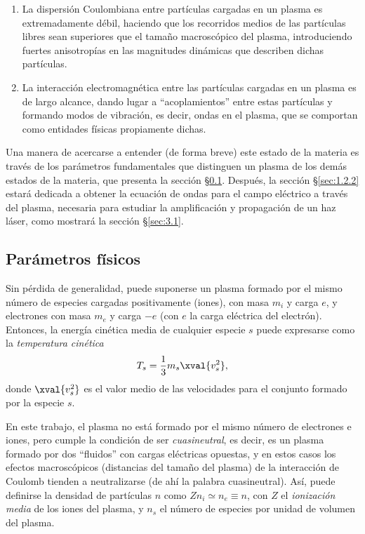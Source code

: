 \begin{enumerate}[label=(\roman*)]

    \item La dispersión Coulombiana entre partículas cargadas en un plasma es extremadamente débil, haciendo que los recorridos medios de las partículas libres sean superiores que el tamaño macroscópico del plasma, introduciendo fuertes anisotropías en las magnitudes dinámicas que describen dichas partículas.

    \item La interacción electromagnética entre las partículas cargadas en un plasma es de largo alcance, dando lugar a \enquote{acoplamientos} entre estas partículas y formando modos de vibración, es decir, ondas en el plasma, que se comportan como entidades físicas propiamente dichas.

\end{enumerate}

Una manera de acercarse a entender (de forma breve) este estado de la materia es través de los parámetros fundamentales que distinguen un plasma de los demás estados de la materia, que presenta la sección \S\ref{sec:1.2.1}. Después, la sección \S\ref{sec:1.2.2} estará dedicada a obtener la ecuación de ondas para el campo eléctrico a través del plasma, necesaria para estudiar la amplificación y propagación de un haz láser, como mostrará la sección \S\ref{sec:3.1}.

\subsection{Parámetros físicos}\label{sec:1.2.1}
Sin pérdida de generalidad, puede suponerse un plasma formado por el mismo número de especies cargadas positivamente (iones), con masa $m_{i}$ y carga $e$, y electrones con masa $m_{e}$ y carga $-e$ (con $e$ la carga eléctrica del electrón). Entonces, la energía cinética media de cualquier especie $s$ puede expresarse como la \emph{temperatura cinética} \autocite{Fitzpatrick2022}
\begin{equation}\label{eq:1.46}
  T_{s} = \frac{1}{3}m_{s}\xval{v_{s}^{2}},
\end{equation}
donde $\xval{v_{s}^{2}}$ es el valor medio de las velocidades para el conjunto formado por la especie $s$.

En este trabajo, el plasma no está formado por el mismo número de electrones e iones, pero cumple la condición de ser \emph{cuasineutral}, es decir, es un plasma formado por dos \enquote{fluidos} con cargas eléctricas opuestas, y en estos casos los efectos macroscópicos (distancias del tamaño del plasma) de la interacción de Coulomb tienden a neutralizarse (de ahí la palabra cuasineutral). Así, puede definirse la densidad de partículas $n$ como $Zn_{i} \simeq n_{e} \equiv n$, con $Z$ el \emph{ionización media} de los iones del plasma, y $n_{s}$ el número de especies por unidad de volumen del plasma. 

